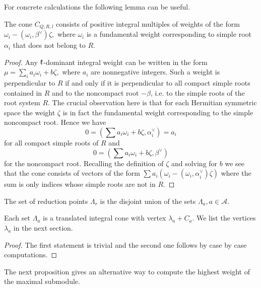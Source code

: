 
For concrete calculations the following lemma can be useful. 

\begin{lemma}
The cone $C_{Q, R, l}$ consists of positive integral multiples of weights of the form $\omega_i - (\omega_i, \beta^\vee) \zeta,$ where $\omega_i$ is a fundamental weight corresponding to simple root $\alpha_i$ that does not belong to $R$.
\end{lemma}
\begin{proof}
 Any  $\mathfrak{k}$-dominant integral weight can be written in the form $\mu = \sum_i a_i \omega_i + b \zeta,$ where $a_i$ are nonnegative integers. Such a weight is perpendicular to $R$ if and only if it is perpendicular to all compact simple roots contained in $R$ and to the noncompact root $-\beta$, i.e. to the simple roots of the root system $R$. The crucial observation here is that for each Hermitian symmetric space the weight $\zeta$ is in fact the fundamental weight corresponding to the simple noncompact root. Hence we have 
\[
0 = \left(\sum a_i \omega_i + b \zeta, \alpha_i^\vee \right) = a_i 
\] 
for all compact simple roots of  $R$ and 
\[
0 = \left(\sum a_i \omega_i + b \zeta, \beta^\vee \right)
\]
for the noncompact root. Recalling the definition of $\zeta$ and solving for $b$ we see that the cone consists of vectors of the form $\sum a_i (\omega_i - (\omega_i, \alpha_i^\vee)\zeta)$ where the sum is only indices whose simple roots are not in $R$.
\end{proof}

\begin{proposition}
 The set of reduction points $\Lambda_r$ is the disjoint union of the sets $\Lambda_a, a\in\mathcal{A}$.

 Each set $\Lambda_a$ is a translated integral cone with vertex $\lambda_a + C_a$. We list the vertices $\lambda_a$ in the next section.
\end{proposition}
\begin{proof}
 The first statement is trivial and the second one follows by case by case computations.
\end{proof}

The next proposition gives an alternative way to compute the highest weight of the maximal submodule.

